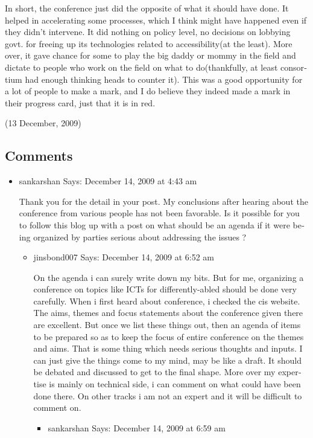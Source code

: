 \begin{english}
In short, the conference just did the opposite of what it should have done. It helped in accelerating some processes, which I think might have happened even if they didn’t intervene. It did nothing on policy level, no decisions on lobbying govt. for freeing up its technologies related to accessibility(at the least). More over, it gave chance for some to play the big daddy or mommy in the field and dictate to people who work on the field on what to do(thankfully, at least consortium had enough thinking heads to counter it). This was a good opportunity for a lot of people to make a mark, and I do believe they indeed made a mark in their progress card, just that it is in red.

\begin{flushright}(13 December, 2009)\end{flushright}

\subsection*{Comments}
\begin{itemize}
\item sankarshan Says:
December 14, 2009 at 4:43 am

Thank you for the detail in your post. My conclusions after hearing about the conference from various people has not been favorable. Is it possible for you to follow this blog up with a post on what should be an agenda if it were being organized by parties serious about addressing the issues ?
    \begin{itemize}
    \item jinsbond007 Says:
    December 14, 2009 at 6:52 am

    On the agenda i can surely write down my bits. But for me, organizing a conference on topics like ICTs for differently-abled should be done very carefully. When i first heard about conference, i checked the cis website. The aims, themes and focus statements about the conference given there are excellent. But once we list these things out, then an agenda of items to be prepared so as to keep the focus of entire conference on the themes and aims. That is some thing which needs serious thoughts and inputs. I can just give the things come to my mind, may be like a draft. It should be debated and discussed to get to the final shape. More over my expertise is mainly on technical side, i can comment on what could have been done there. On other tracks i am not an expert and it will be difficult to comment on.
        \begin{itemize}
	\item sankarshan Says:
        December 14, 2009 at 6:59 am


\end{itemize}
\end{itemize}
\end{itemize}
\end{english}
